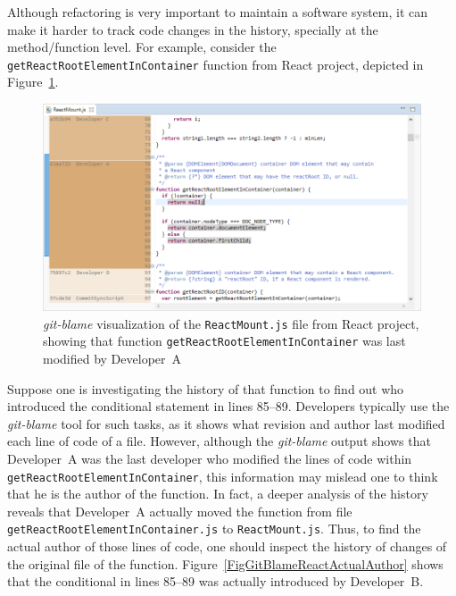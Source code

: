 Although refactoring is very important to maintain a software system, it can make it harder to track code changes in the history, specially at the method/function level.
For example, consider the \texttt{getReactRootElementInContainer} function from React project, depicted in Figure~\ref{FigGitBlameReact}.
\begin{figure}[b]
\centering
\includegraphics[width=\linewidth]{img/git-blame-react.png}
\caption{\textit{git-blame} visualization of the \texttt{ReactMount.js} file from React project, showing that function \texttt{getReactRootElementInContainer} was last modified by Developer~A}
\label{FigGitBlameReact}
\end{figure}
Suppose one is investigating the history of that function to find out who introduced the conditional statement in lines 85--89. Developers typically use the \textit{git-blame} tool for such tasks, as it shows what revision and author last modified each line of code of a file. However, although the \textit{git-blame} output shows that Developer~A was the last developer who modified the lines of code within \texttt{getReactRootElementInContainer}, this information may mislead one to think that he is the author of the function.
In fact, a deeper analysis of the history reveals that Developer~A actually moved the function from file \texttt{getReactRootElementInContainer.js} to \texttt{ReactMount.js}.
Thus, to find the actual author of those lines of code, one should inspect the history of changes of the original file of the function. Figure~\ref{FigGitBlameReactActualAuthor} shows that the conditional in lines 85--89 was actually introduced by Developer~B.


